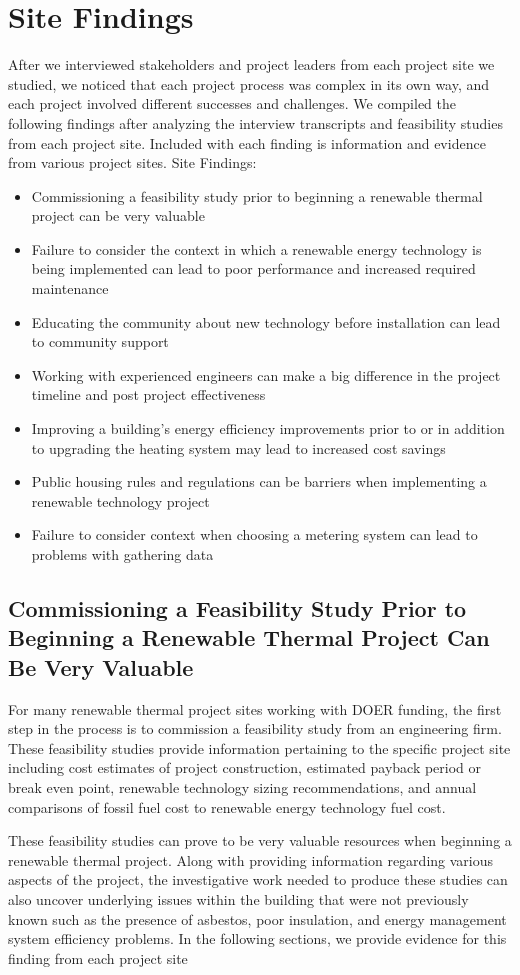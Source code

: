 \section{Site Findings}
\par After we interviewed stakeholders and project leaders from each project site we studied, we noticed that each project process was complex in its own way, and each project involved different successes and challenges. We compiled the following findings after analyzing the interview transcripts and feasibility studies from each project site. Included with each finding is information and evidence from various project sites.
Site Findings:
  \begin{itemize}
    \item{Commissioning a feasibility study prior to beginning a renewable thermal project can be very valuable}
    \item{Failure to consider the context in which a renewable energy technology is being implemented can lead to poor performance and increased required maintenance}
    \item{Educating the community about new technology before installation can lead to community support}
    \item{Working with experienced engineers can make a big difference in the project timeline and post project effectiveness}
    \item{Improving a building’s energy efficiency improvements prior to or in addition to upgrading the heating system may lead to increased cost savings}
    \item{Public housing rules and regulations can be barriers when implementing a renewable technology project}
    \item{Failure to consider context when choosing a metering system can lead to problems with gathering data}
  \end{itemize}

\subsection{Commissioning a Feasibility Study Prior to Beginning a Renewable Thermal Project Can Be Very Valuable}
\par For many renewable thermal project sites working with DOER funding, the first step in the process is to commission a feasibility study from an engineering firm. These feasibility studies provide information pertaining to the specific project site including cost estimates of project construction, estimated payback period or break even point, renewable technology sizing recommendations, and annual comparisons of fossil fuel cost to renewable energy technology fuel cost.
\par These feasibility studies can prove to be very valuable resources when beginning a renewable thermal project. Along with providing information regarding various aspects of the project, the investigative work needed to produce these studies can also uncover underlying issues within the building that were not previously known such as the presence of asbestos, poor insulation, and energy management system efficiency problems. In the following sections, we provide evidence for this finding from each project site

